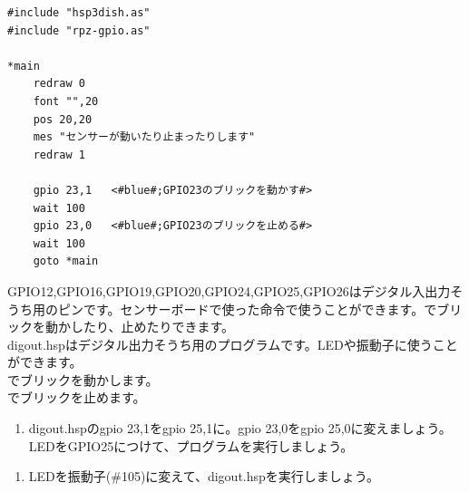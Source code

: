 \begin{lstlisting}[caption=digout.hsp,label=digout.hsp]
#include "hsp3dish.as"
#include "rpz-gpio.as"

*main
	redraw 0
	font "",20
	pos 20,20
	mes "センサーが動いたり止まったりします"
	redraw 1

	gpio 23,1	<#blue#;GPIO23のブリックを動かす#>
	wait 100
	gpio 23,0	<#blue#;GPIO23のブリックを止める#>
	wait 100
	goto *main
\end{lstlisting}

GPIO12,GPIO16,GPIO19,GPIO20,GPIO24,GPIO25,GPIO26はデジタル入出力そうち用のピンです。センサーボードで使った命令で使うことができます。でブリックを動かしたり、止めたりできます。\\

digout.hspはデジタル出力そうち用のプログラムです。LEDや振動子に使うことができます。\\
でブリックを動かします。\\
でブリックを止めます。\\

\begin{tcolorbox}[title=\useOmetoi]
\begin{enumerate}
\item digout.hspのgpio 23,1をgpio 25,1に。gpio 23,0をgpio 25,0に変えましょう。LEDをGPIO25につけて、プログラムを実行しましょう。
\end{enumerate}
\end{tcolorbox}
\begin{tcolorbox}[title=\useOmetoi]
\begin{enumerate}
\item LEDを振動子(\#105)に変えて、digout.hspを実行しましょう。
\end{enumerate}
\end{tcolorbox}

